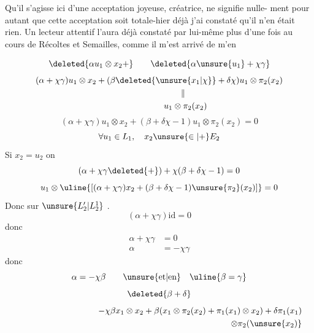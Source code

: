Qu'il s'agisse ici d'une acceptation joyeuse, créatrice, ne signifie nulle-\linebreak
ment pour autant que cette acceptation soit totale-hier déjà j'ai constaté qu'il
n'en était rien. Un lecteur attentif l'aura déjà constaté par lui-même plus d'une
fois au cours de Récoltes et Semailles, comme il m'est arrivé de m'en
\margin{\unsure{-}}

\[
\deleted{\alpha u_1\otimes x_2+}\qquad
\deleted{\alpha\unsure{u_1}+\chi\gamma}
\]
\[
\begin{aligned}
&(\alpha+\chi\gamma)u_1\otimes x_2+(\beta\deleted{\unsure{x_1|\chi}}+\delta\chi)u_1\otimes\pi_2(x_2)\\
&\hspace{17em}\Vert\\
&\hspace{15em}u_1\otimes\pi_2(x_2)
\end{aligned}
\]
\[
(\alpha+\chi\gamma)u_1\otimes x_2+(\beta+\delta\chi-1)u_1\otimes\pi_2(x_2)=0
\]
\[
\forall u_1\in L_1,\quad x_2\unsure{\in|+}E_2
\]
Si \(x_2=u_2\) on 
\[
(\alpha+\chi\gamma\deleted{+})+\chi(\beta+\delta\chi-1)=0
\]
\[
u_1\otimes\uline{[(\alpha+\chi\gamma)x_2+(\beta+\delta\chi-1)\unsure{\pi_2}(x_2)]}=0
\]
Donc sur \(\unsure{L'_2|L_2^1}\) .
\[
(\alpha+\chi\gamma)\mathrm{id}=0
\]
donc
\[
\begin{aligned}
\alpha+\chi\gamma&=0\\
\alpha&=-\chi\gamma
\end{aligned}
\]
donc 
\[
\alpha=-\chi\beta\qquad\text{\unsure{et|en}}\quad\uline{\beta=\gamma}
\]
\[\deleted{\beta+\delta}\]
\[
\begin{aligned}
-\chi\beta x_1\otimes x_2+\beta(x_1\otimes\pi_2(x_2)+\pi_1(x_1)\otimes x_2)+\delta\pi_1(x_1)\\
\hspace{25em}\otimes\pi_2(\unsure{x_2)}
\end{aligned}
\]

